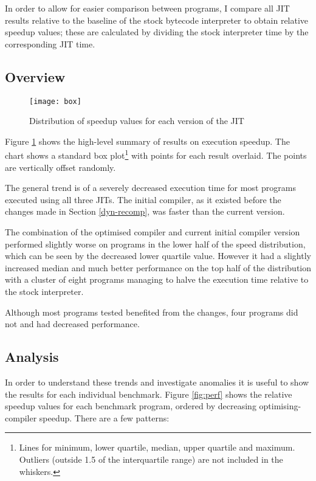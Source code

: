 In order to allow for easier comparison between programs, I compare all JIT results relative
to the baseline of the stock bytecode interpreter to obtain relative speedup values; these are
calculated by dividing the stock interpreter time by the corresponding JIT time.

\subsection{Overview}

\begin{figure}[h]
      \texttt{[image: box]}
      \caption{Distribution of speedup values for each version of the JIT}
      \label{fig:box}
\end{figure}

Figure \ref{fig:box} shows the high-level summary of results on execution speedup. The
chart shows a standard box plot\footnote{Lines for minimum, lower quartile, median, upper quartile
      and maximum. Outliers (outside
      1.5 of the interquartile range) are not included in the whiskers.}
with points for each result overlaid. The points are vertically
offset randomly.

The general trend is of a severely decreased execution time for most programs executed using all
three JITs. The initial compiler, as it existed before the changes made in Section
\ref{dyn-recomp},
was faster than the current version.

The combination of the optimised compiler and current initial compiler version performed slightly
worse on programs in the lower half of the speed distribution, which can be seen by the decreased
lower quartile value.  However it had a slightly increased median and much better performance on
the
top half of the distribution with a cluster of eight programs managing to halve the execution time
relative to the stock interpreter.

Although most programs tested benefited from the changes, four programs did not and had decreased
performance.

\subsection{Analysis}

In order to understand these trends and investigate anomalies it is useful to show the results for
each individual benchmark. Figure \ref{fig:perf} shows the relative speedup values for each
benchmark program, ordered by decreasing optimising-compiler speedup. There are a few patterns:

